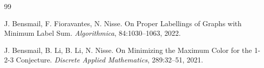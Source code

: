 \documentclass[a4paper,11pt,dvipsnames]{elsarticle}
\begin{document}
\begin{thebibliography}{99}







 J. Bensmail, F. Fioravantes, N. Nisse. On Proper Labellings of Graphs with Minimum Label Sum. \textit{Algorithmica}, 84:1030--1063, 2022.

 J. Bensmail, B. Li, B. Li, N. Nisse. On Minimizing the Maximum Color for the 1-2-3 Conjecture. \textit{Discrete Applied Mathematics}, 289:32--51, 2021.






\end{thebibliography}
\end{document}
